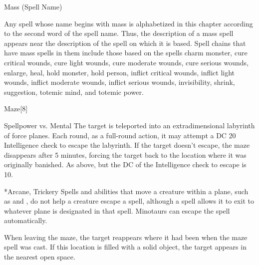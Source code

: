 \begin{spellsection}{Mass (Spell Name)}
    \par Any spell whose name begins with mass is alphabetized in this chapter according to the second word of the spell name. Thus, the description of a mass spell appears near the description of the spell on which it is based. Spell chains that have mass spells in them include those based on the spells charm monster, cure critical wounds, cure light wounds, cure moderate wounds, cure serious wounds, enlarge, heal, hold monster, hold person, inflict critical wounds, inflict light wounds, inflict moderate wounds, inflict serious wounds, invisibility, shrink, suggestion, totemic mind, and totemic power.
\end{spellsection}

\begin{spellsection}{Maze}[8]
    \begin{spellheader}
    \end{spellheader}
    \begin{spellcontent}
        \begin{spelltargetinginfo}
        \end{spelltargetinginfo}
        \begin{spelleffects}
            \begin{spellattack}{Spellpower vs. Mental}
                \spellsuccess The target is teleported into an extradimensional labyrinth of force planes. Each round, as a full-round action, it may attempt a DC 20 Intelligence check to escape the labyrinth. If the target doesn't escape, the maze disappears after 5 minutes, forcing the target back to the location where it was originally banished.
                \spellfailure As above, but the DC of the Intelligence check to escape is 10.
            \end{spellattack}
        \end{spelleffects}
    \end{spellcontent}
    \begin{spellfooter}
        *{Arcane, Trickery}
        \spellnotes Spells and abilities that move a creature within a plane, such as  and , do not help a creature escape a  spell, although a  spell allows it to exit to whatever plane is designated in that spell. Minotaurs can escape the spell automatically.

        When leaving the maze, the target reappears where it had been when the maze spell was cast. If this location is filled with a solid object, the target appears in the nearest open space.

        \norepeatspellnotes
        \miscastrandom
    \end{spellfooter}
\end{spellsection}

